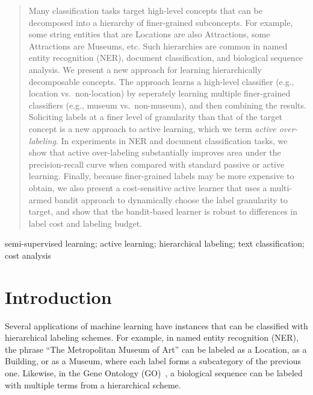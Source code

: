 \documentclass[10pt, conference, compsocconf]{IEEEtran}
\begin{document}
\begin{abstract} 
Many classification tasks target high-level concepts
that can be decomposed into a hierarchy of finer-grained
subconcepts.  For example, some string entities that are Locations
are also Attractions, some Attractions are Museums, etc.  Such hierarchies are common in
named entity recognition (NER), document classification, and biological
sequence analysis.
We present a new approach for learning hierarchically decomposable
concepts.  The approach learns a high-level classifier
(e.g., location vs.\ non-location) by seperately learning multiple finer-grained
classifiers (e.g., museum vs.\ non-museum), and then combining the results.
Soliciting labels at a finer level of granularity
than that of the target concept is a new approach to active learning,
which we term {\em active over-labeling}.
In experiments in NER and document classification tasks, we show that active over-labeling substantially
improves area under the precision-recall curve
when compared with standard passive or active learning.
Finally, because finer-grained labels may be more expensive to obtain, we also present a cost-sensitive
active learner that uses a multi-armed bandit approach to dynamically choose the label granularity to target, and show that the 
bandit-based learner is
robust to differences in label cost and labeling budget.
\end{abstract} 

\begin{keywords}
semi-supervised learning; active learning; hierarchical labeling; text classification; cost analysis
\end{keywords}



\section{Introduction}
\label{sec:intro}
Several applications of machine learning have instances
that can be classified with hierarchical labeling
schemes.  For example, in named entity recognition (NER), the phrase
``The Metropolitan Museum of Art'' can be labeled as a Location, as a Building,
or as a Museum, where each label forms a subcategory of the
previous one.  Likewise, in the Gene Ontology (GO)~\cite{GeneOntology},
a biological sequence can be
labeled with multiple terms from a hierarchical scheme.
\end{document}
